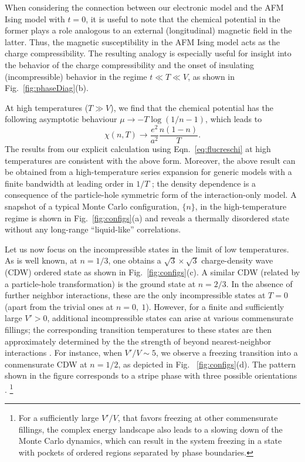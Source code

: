 \documentclass[aps,prx,onecolumn,amsmath,nofootinbib,amssymb,11pt]{revtex4-1}
\begin{document}
{When considering the connection between our electronic model and the AFM Ising model with $t=0$, it is useful to note that the chemical potential in the former plays a role analogous to an external (longitudinal) magnetic field in the latter. Thus, the magnetic susceptibility in the AFM Ising model acts as the charge compressibility. The resulting analogy is especially useful for insight into the behavior of the charge compressibility and the onset of insulating (incompressible) behavior in the regime $t\ll T\ll V$, as shown in Fig.~\ref{fig:phaseDiag}(b). 

At high temperatures ($T\gg V$), we find that the chemical potential has the following asymptotic behaviour $\mu \rightarrow -T\log \left( 1/n -1\right)$, which leads to
\begin{equation}
    \chi (n,T) \rightarrow \frac{e^2}{a^2} \frac{n(1-n)}{T}. 
    \label{eqn:HighTcompressibility}
\end{equation}
The results from our explicit calculation using Eqn.~\ref{eq:flucreschi} at high temperatures are consistent with the above form. Moreover, the above result can be obtained from a high-temperature series expansion for generic models with a finite bandwidth at leading order in $1/T$ \cite{ChaikinThermopower, HubbHighTGeorges}; the density dependence is a consequence of the particle-hole symmetric form of the interaction-only model. A snapshot of a typical Monte Carlo configuration, $\{n\}$, in the high-temperature regime is shown in Fig.~\ref{fig:configs}(a) and reveals a thermally disordered state without any long-range ``liquid-like'' correlations. 

Let us now focus on the incompressible states in the limit of low temperatures. As is well known, at $n=1/3$, one obtains a $\sqrt{3}\times\sqrt{3}$ charge-density wave (CDW) ordered state as shown in Fig.~\ref{fig:configs}(c). A similar CDW (related by a particle-hole transformation) is the ground state at $n=2/3$. In the absence of further neighbor interactions, these are the only incompressible states at $T=0$ (apart from the trivial ones at $n=0,~1$). However, for a finite and sufficiently large $V'>0$, additional incompressible states can arise at various commensurate fillings; the corresponding transition temperatures to these states are then approximately determined by the the strength of beyond nearest-neighbor interactions \cite{NovikovLevitov, Smerald_2016}. For instance, when $V'/V\sim5$, we observe a freezing transition into a conmensurate CDW at $n=1/2$, as depicted in Fig.~ \ref{fig:configs}(d). The pattern shown in the figure corresponds to a stripe phase with three possible orientations \cite{StripePhaseTriag}. {\footnote{\textsf{For a sufficiently large $V'/V$, that favors freezing at other commensurate fillings, the complex energy landscape also leads to a slowing down of the Monte Carlo dynamics, which can result in the system freezing in a state with pockets of ordered regions separated by phase boundaries.}}} 

}
\end{document}
